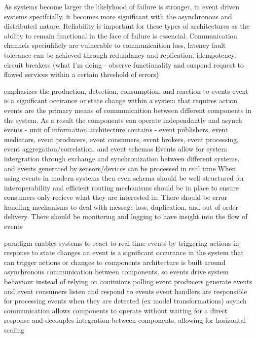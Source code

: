 \cite{chavan2024fault}
As systems become larger the likelyhood of failure is stronger, in event driven systems specifcially, it becomes more significant with the asynchronous and distributed nature.
Reliability is important for these types of architectures as the ability to remain functional in the face of failure is essencial. Communication channels speciufificly are vulnerable to communicaition loss, latency
fault tolerance can be achieved through redundancy and replication, idempotency, circuit breakers (what I'm doing - observe functionality and suspend request to flawed services within a certain threshold of errors)


\cite{manchana2021event}
emphasizes the production, detection, consumption, and reaction to events
event is a significant occirance or state change within a system that requires action
events are the primary means of communicaition between different components in the system. As a result the components can operate independantly and asynch
events - unit of information
architecture contains - event publishers, event mediators, event producers, event consumers, event brokers, event processing, event aggregation/correlation, and event schemas
Events allow for system intergration through exchange and synchronization between different systems, and events generated by sensors/devices can be processed in real time
When using events in modern systems then even schema should be well structured for interoperability and efficient routing mechanisms should be in place to ensure consumers only recieve what they are interested in. There should be error handling mechanisms to deal with message loss, duplication, and out of order delivery. There should be monitering and logging to have insight into the flow of events


\cite{kommera2020power}
paradigm enables systems to react to real time events by triggering actions in response to state changes
an event is a significant occurance in the system that can trigger actions or changes to components
architecture is built around asynchronous communication between components, so events drive system behaviour instead of relying on continious polling
event producers generate events and event consumers listen and respond to events
event handlers are responsible for processing events when they are detected (ex model transformations)
asynch communication allows components to operate without waiting for a direct response and decouples integration between components, allowing for horizontal scaling




